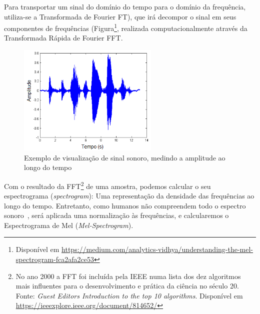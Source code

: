 Para transportar um sinal do domínio do tempo para o domínio da frequência, utiliza-se a Transformada de Fourier \acrlong{FT}), que irá decompor o sinal em seus componentes de frequências (Figura\footnote{Disponível em \url{https://medium.com/analytics-vidhya/understanding-the-mel-spectrogram-fca2afa2ce53}}, realizada computacionalmente através da Transformada Rápida de Fourier \acrlong{FFT}. 

\begin{figure}[]
\centering
\includegraphics[width=0.6\textwidth]{img/exsinalsom.PNG}
\caption{\label{fig:exsinalsom}Exemplo de visualização de sinal sonoro, medindo a amplitude ao longo do tempo}
\author{Fonte: UNESP, Princípios de Comunicações, 2013}
\end{figure}


Com o resultado da \acrshort{FFT}\footnote{No ano 2000 a \acrshort{FFT} foi incluída pela IEEE numa lista dos dez algoritmos mais influentes para o desenvolvimento e prática da ciência no século 20. Fonte: \textit{Guest Editors Introduction to the top 10 algorithms}. Disponível em \url{https://ieeexplore.ieee.org/document/814652/}} de uma amostra, podemos calcular o seu espectrograma (\textit{spectrogram}): Uma representação da densidade das frequências ao longo do tempo. Entretanto, como humanos não compreendem todo o espectro sonoro~\cite{62}, será aplicada uma normalização às frequências, e calcularemos o Espectrograma de Mel (\textit{Mel-Spectrogram}).


